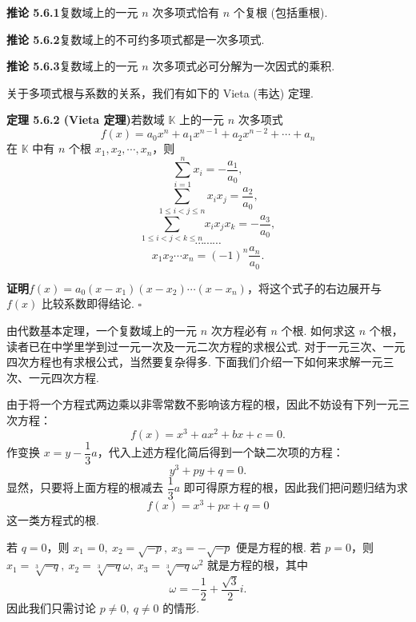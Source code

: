 \documentclass[UTF8,12pt,a4paper,fontset=fandol]{ctexart}
\begin{document}
\noindent\textbf{推论 5.6.1}\quad 复数域上的一元 $n$ 次多项式恰有 $n$ 个复根 (包括重根).

\noindent\textbf{推论 5.6.2}\quad 复数域上的不可约多项式都是一次多项式.

\noindent\textbf{推论 5.6.3}\quad 复数域上的一元 $n$ 次多项式必可分解为一次因式的乘积.

关于多项式根与系数的关系，我们有如下的 Vieta (韦达) 定理.

\noindent\textbf{定理 5.6.2 (Vieta 定理)}\quad 若数域 $\mathbb{K}$ 上的一元 $n$ 次多项式
\[
f(x)=a_0x^n+a_1x^{n-1}+a_2x^{n-2}+\cdots+a_n
\]
在 $\mathbb{K}$ 中有 $n$ 个根 $x_1,x_2,\cdots,x_n$，则
\[
\sum_{i=1}^n x_i=-\frac{a_1}{a_0},
\]
\[
\sum_{1\leq i<j\leq n}x_ix_j=\frac{a_2}{a_0},
\]
\[
\sum_{1\leq i<j<k\leq n}x_ix_jx_k=-\frac{a_3}{a_0},
\]
\[
\cdots\cdots\cdots
\]
\[
x_1x_2\cdots x_n=(-1)^n\frac{a_n}{a_0}.
\]

\noindent\textbf{证明}\quad $f(x)=a_0(x-x_1)(x-x_2)\cdots(x-x_n)$，将这个式子的右边展开与 $f(x)$ 比较系数即得结论. $\square$

由代数基本定理，一个复数域上的一元 $n$ 次方程必有 $n$ 个根. 如何求这 $n$ 个根，读者已在中学里学到过一元一次及一元二次方程的求根公式. 对于一元三次、一元四次方程也有求根公式，当然要复杂得多. 下面我们介绍一下如何来求解一元三次、一元四次方程.

由于将一个方程式两边乘以非零常数不影响该方程的根，因此不妨设有下列一元三次方程：
\[
f(x)=x^3+ax^2+bx+c=0.
\]
作变换 $x=y-\dfrac13a$，代入上述方程化简后得到一个缺二次项的方程：
\[
y^3+py+q=0.
\]
显然，只要将上面方程的根减去 $\dfrac13a$ 即可得原方程的根，因此我们把问题归结为求
\begin{equation}
f(x)=x^3+px+q=0
\tag{5.6.4}
\end{equation}
这一类方程式的根.

若 $q=0$，则 $x_1=0,\ x_2=\sqrt{-p},\ x_3=-\sqrt{-p}$ 便是方程的根. 若 $p=0$，则 $x_1=\sqrt[3]{-q},\ x_2=\sqrt[3]{-q}\omega,\ x_3=\sqrt[3]{-q}\omega^2$ 就是方程的根，其中
\[
\omega=-\frac12+\frac{\sqrt{3}}{2}i.
\]
因此我们只需讨论 $p\neq 0,\ q\neq 0$ 的情形.
\end{document}
